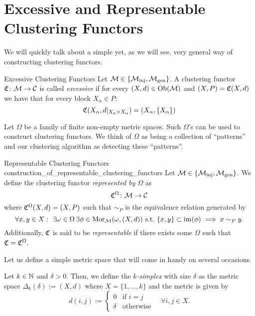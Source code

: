 \section{Excessive and Representable Clustering Functors}

We will quickly talk about a simple yet, as we will see, very general way of constructing clustering functors.

\begin{definition}{Excessive Clustering Functors \cite[Def.~6.2]{Carlsson2010}}{}
Let $\mathcal{M} \in \{{\mathcal{M}_\mathrm{inj}}, {\mathcal{M}_\mathrm{gen}}\}$. A clustering functor $\mathfrak{C}\colon \mathcal{M} \to \mathcal{C}$ is called \emph{excessive} if for every $(X,d) \in \mathrm {Ob}(\mathcal{M})$ and $(X,P) = \mathfrak{C}(X,d)$ we have that for every block $X_\alpha \in P$:
$$
\mathfrak{C}(X_\alpha, d|_{X_\alpha \times X_\alpha}) = (X_\alpha, \{X_\alpha\})
$$
\end{definition}

Let $\Omega$ be a family of finite non-empty metric spaces. Such $\Omega$'s can be used to construct clustering functors. We think of $\Omega$ as being a collection of ``patterns'' and our clustering algorithm as detecting these ``patterns''.

\begin{definition}{Representable Clustering Functors \cite[Sec.~6.2]{Carlsson2010}}{construction_of_representable_clustering_functors}
Let $\mathcal{M} \in \{{\mathcal{M}_\mathrm{inj}}, {\mathcal{M}_\mathrm{gen}}\}$. We define the clustering functor \emph{represented by $\Omega$} as
$$
\mathfrak{C}^\Omega\colon \mathcal{M} \to \mathcal{C}
$$
where $\mathfrak{C}^\Omega(X,d) = (X, P)$ such that $\sim_P$ 
is the equivalence relation generated by
\begin{equation*}
    \forall x,y \in X: \ \exists \omega \in \Omega \,\exists \phi \in \mathrm {Mor}_{\mathcal{M}}(\omega, (X,d)) \ \text{s.t.} \ \{x,y\} \subset \operatorname*{im}(\phi) \implies x \sim_P y.
\end{equation*}
Additionally, $\mathfrak{C}$ is said to be \emph{representable} if there exists some $\Omega$ such that $\mathfrak{C} = \mathfrak{C}^\Omega$.
\end{definition}

Let us define a simple metric space that will come in handy on several occasions.
\begin{definition}{}{}
    Let $k \in \mathbb N$ and $\delta > 0$. Then, we define the \emph{$k$-simplex} with size $\delta$ as the metric space $\Delta_k(\delta) := (X,d)$ where $X = \{1, \dots, k\}$ and the metric is given by
    $$
    d(i,j) := \begin{cases}
        0 & \text{if } i = j\\
        \delta & \text{otherwise}
    \end{cases} \quad \forall i,j \in X.
    $$
\end{definition}

